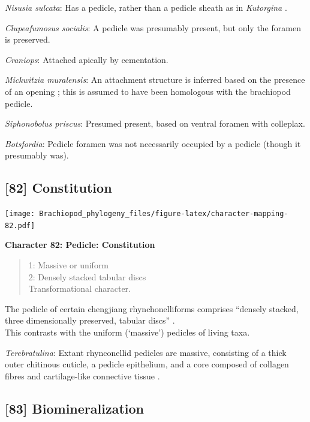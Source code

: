 \documentclass[]{book}
\theoremstyle{definition}
\theoremstyle{definition}
\theoremstyle{definition}
\theoremstyle{remark}
\begin{document}
\emph{Nisusia sulcata}: Has a pedicle, rather than a pedicle sheath as
in \emph{Kutorgina}
\citep{Holmer2018Evolutionarysignificance, Holmer2018Theattachment}.

\emph{Clupeafumosus socialis}: A pedicle was presumably present, but
only the foramen is preserved.

\emph{Craniops}: Attached apically by cementation.

\emph{Mickwitzia muralensis}: An attachment structure is inferred based
on the presence of an opening \citep{Balthasar2004Shellstructure}; this
is assumed to have been homologous with the brachiopod pedicle.

\emph{Siphonobolus priscus}: Presumed present, based on ventral foramen
with colleplax.

\emph{Botsfordia}: Pedicle foramen was not necessarily occupied by a
pedicle (though it presumably was).

\hypertarget{constitution}{%
\subsection*{{[}82{]} Constitution}\label{constitution}}

\texttt{[image: Brachiopod\_phylogeny\_files/figure-latex/character-mapping-82.pdf]}

\textbf{Character 82: Pedicle: Constitution}

\begin{quote}
1: Massive or uniform\\
2: Densely stacked tabular discs\\
Transformational character.
\end{quote}

The pedicle of certain chengjiang rhynchonelliforms comprises ``densely
stacked, three dimensionally preserved, tabular discs''
\citep{Holmer2018Evolutionarysignificance}.\\
This contrasts with the uniform (`massive') pedicles of living taxa.

\emph{Terebratulina}: Extant rhynconellid pedicles are massive,
consisting of a thick outer chitinous cuticle, a pedicle epithelium, and
a core composed of collagen fibres and cartilage-like connective tissue
\citep{Holmer2018Evolutionarysignificance}.

\hypertarget{biomineralization}{%
\subsection*{{[}83{]} Biomineralization}\label{biomineralization}}
\end{document}
